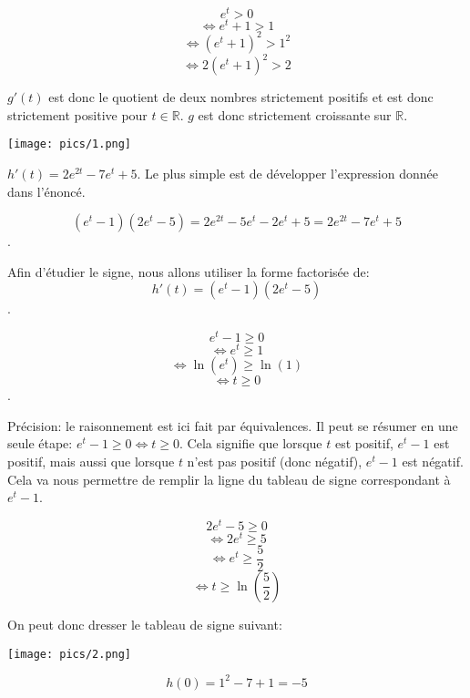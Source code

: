 \documentclass[a4paper,12pt]{scrartcl}
\begin{document}

$$e^t > 0$$
$$\Leftrightarrow e^t+1 > 1$$
$$\Leftrightarrow (e^t + 1)^2 > 1^2$$
$$\Leftrightarrow 2(e^t + 1)^2 > 2$$

$g'(t)$ est donc le quotient de deux nombres strictement positifs et est donc strictement positive pour $t \in \mathbb{R}$. $g$ est donc strictement croissante sur $\mathbb{R}$.

\begin{center}
\texttt{[image: pics/1.png]}
\end{center}


\question{}

$h'(t) = 2e^{2t} - 7e^t + 5$. Le plus simple est de développer l'expression donnée dans l'énoncé. 

$$(e^t - 1)(2e^t-5) = 2e^{2t} - 5e^t - 2e^t + 5 = 2e^{2t} - 7e^t + 5$$.

\question{}

\subquestion{}

Afin d'étudier le signe, nous allons utiliser la forme factorisée de: $$h'(t) = (e^t-1)(2e^t-5)$$.


$$e^t-1 \geq 0$$ %
$$\Leftrightarrow e^t \geq 1$$
$$\Leftrightarrow \ln(e^t) \geq \ln(1)$$
$$\Leftrightarrow t \geq 0$$.

Précision: le raisonnement est ici fait par équivalences. Il peut se résumer en une seule étape: $e^t-1 \geq 0 \Leftrightarrow t \geq 0$. Cela signifie que lorsque $t$ est positif, $e^t - 1$ est positif, mais aussi que lorsque $t$ n'est pas positif (donc négatif), $e^t - 1$ est négatif. Cela va nous permettre de remplir la ligne du tableau de signe correspondant à $e^t - 1$. 


$$2e^t - 5 \geq 0$$
$$\Leftrightarrow 2e^t \geq 5$$
$$\Leftrightarrow e^t \geq \dfrac{5}{2}$$
$$\Leftrightarrow t \geq \ln \left( \dfrac{5}{2} \right)$$

On peut donc dresser le tableau de signe suivant:

\begin{center}
\texttt{[image: pics/2.png]}
\end{center}

\subquestion{}

$$h(0) = 1^2 - 7 + 1 = -5$$
\end{document}
